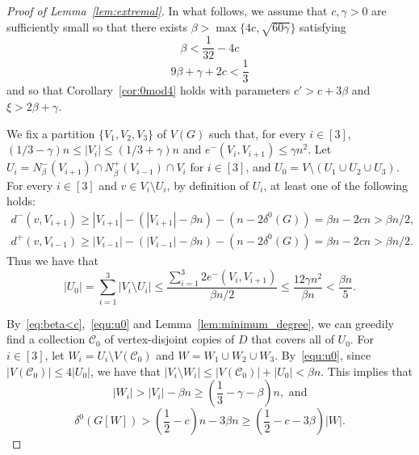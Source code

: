 \documentclass[11pt]{amsart}
\newcommand{\C}{\mathcal{C}}
\begin{document}
\begin{proof}[Proof of Lemma~\ref{lem:extremal}]
    In what follows, we assume that $c, \gamma >0$ are sufficiently small so that there exists $\beta > \max\{ 4c, \sqrt{60\gamma} \}$ satisfying   
    \begin{equation}\label{eq:beta<c}
        \beta < \frac{1}{32}-4c
    \end{equation}
    \begin{equation}\label{eq:bgc<1/3}
        9\beta + \gamma + 2c < \frac{1}{3}
    \end{equation}
    and so that Corollary~\ref{cor:0mod4} holds with parameters $c' > c+3\beta$ and $\xi > 2\beta +\gamma $. 
    
    We fix a partition $\{V_1,V_2,V_3\}$ of $V(G)$ such that, for every $i\in[3]$, $(1/3 - \gamma)n \le |V_i| \le (1/3 + \gamma)n$ and $e^-(V_i,V_{i+1})\le \gamma n^2$.
    Let $U_i=N^-_\beta(V_{i+1})\cap N^+_\beta(V_{i-1}) \cap V_i$ for $i\in [3]$, and $U_0=V\setminus(U_1\cup U_2\cup U_3)$.
    For every $i\in[3]$ and $v\in V_i\setminus U_i$, by definition of $U_i$, at least one of the following holds:
    \begin{align*}
        d^-(v,V_{i+1})\ge |V_{i+1}|-(|V_{i+1}|-\beta n)-(n-2\delta^0(G))=\beta n-2cn > \beta n/2,\\
        d^+(v,V_{i-1})\ge |V_{i-1}|-(|V_{i-1}|-\beta n)-(n-2\delta^0(G))=\beta n-2cn > \beta n/2.
    \end{align*}
    Thus we have that
    \begin{equation}
        |U_0|=\sum_{i=1}^3|V_i\setminus U_i|\le \frac{\sum_{i=1}^3 2e^-(V_i,V_{i+1})}{\beta n/2}\le \frac{12\gamma n^2}{\beta n} < \frac{\beta n}{5}.\label{equ:u0}
    \end{equation}

    By~\eqref{eq:beta<c},~\eqref{equ:u0} and Lemma~\ref{lem:minimum_degree}, we can greedily find a collection $\C_0$ of vertex-disjoint copies of $D$ that covers all of $U_0$.
    For $i\in[3]$, let $W_i=U_i\setminus V(\C_0)$ and $W=W_1\cup W_2\cup W_3$.
    By~\eqref{equ:u0}, since $|V(\C_0)|\le 4|U_0|$, we have that $|V_i\setminus W_i|\le |V(\C_0)| + |U_0| < \beta n$. This implies that
    \begin{equation} \label{eq:|Wi|}
        |W_i| > |V_i| - \beta n \ge \left(\frac{1}{3} - \gamma - \beta \right) n, \text{ and}
    \end{equation}
    \begin{equation} \label{eq:deg_Wi}
        \delta^0(G[W]) > \left( \frac{1}{2} -c \right)n - 3\beta n \ge 
        \left( \frac{1}{2} -c - 3\beta \right) |W|.
    \end{equation}


\end{proof}
\end{document}
